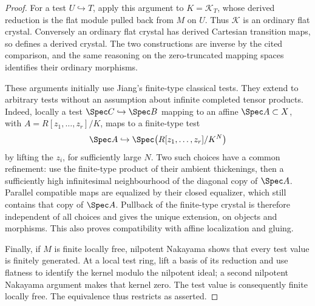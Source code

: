 \begin{proof}
For a test $U\hookrightarrow T$, apply this argument to $K=\mathcal K_T$, whose derived reduction is the flat module pulled back from $M$ on $U$.  Thus $\mathcal K$ is an ordinary flat crystal.  Conversely an ordinary flat crystal has derived Cartesian transition maps, so defines a derived crystal.  The two constructions are inverse by the cited comparison, and the same reasoning on the zero-truncated mapping spaces identifies their ordinary morphisms.

These arguments initially use Jiang's finite-type classical tests.  They extend to arbitrary tests without an assumption about infinite completed tensor products.  Indeed, locally a test $\Spec C\hookrightarrow\Spec B$ mapping to an affine $\Spec A\subset X$, with $A=R[z_1,\ldots,z_r]/K$, maps to a finite-type test
\[
 \Spec A\hookrightarrow\Spec\bigl(R[z_1,\ldots,z_r]/K^N\bigr)
\]
by lifting the $z_i$, for sufficiently large $N$.  Two such choices have a common refinement: use the finite-type product of their ambient thickenings, then a sufficiently high infinitesimal neighbourhood of the diagonal copy of $\Spec A$.  Parallel compatible maps are equalized by their closed equalizer, which still contains that copy of $\Spec A$.  Pullback of the finite-type crystal is therefore independent of all choices and gives the unique extension, on objects and morphisms.  This also proves compatibility with affine localization and gluing.

Finally, if $M$ is finite locally free, nilpotent Nakayama shows that every test value is finitely generated.  At a local test ring, lift a basis of its reduction and use flatness to identify the kernel modulo the nilpotent ideal; a second nilpotent Nakayama argument makes that kernel zero.  The test value is consequently finite locally free.  The equivalence thus restricts as asserted.
\end{proof}

